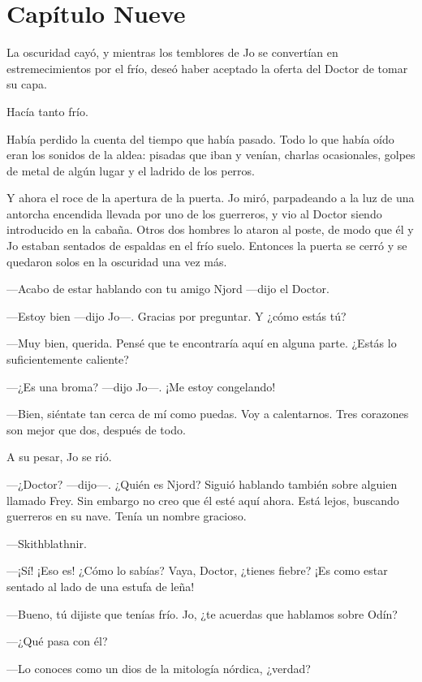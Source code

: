 \chapter*{Capítulo Nueve}

La oscuridad cayó, y mientras los temblores de Jo se convertían en
estremecimientos por el frío, deseó haber aceptado la oferta del Doctor
de tomar su capa.

Hacía tanto frío.

Había perdido la cuenta del tiempo que había pasado. Todo lo que había
oído eran los sonidos de la aldea: pisadas que iban y venían, charlas
ocasionales, golpes de metal de algún lugar y el ladrido de los perros.

Y ahora el roce de la apertura de la puerta. Jo miró, parpadeando a la
luz de una antorcha encendida llevada por uno de los guerreros, y vio al
Doctor siendo introducido en la cabaña. Otros dos hombres lo ataron al
poste, de modo que él y Jo estaban sentados de espaldas en el frío
suelo. Entonces la puerta se cerró y se quedaron solos en la oscuridad
una vez más.

---Acabo de estar hablando con tu amigo Njord ---dijo el Doctor.

---Estoy bien ---dijo Jo---. Gracias por preguntar. Y ¿cómo estás tú?

---Muy bien, querida. Pensé que te encontraría aquí en alguna parte.
¿Estás lo suficientemente caliente?

---¿Es una broma? ---dijo Jo---. ¡Me estoy congelando!

---Bien, siéntate tan cerca de mí como puedas. Voy a calentarnos. Tres
corazones son mejor que dos, después de todo.

A su pesar, Jo se rió.

---¿Doctor? ---dijo---. ¿Quién es Njord? Siguió hablando también sobre
alguien llamado Frey. Sin embargo no creo que él esté aquí ahora. Está
lejos, buscando guerreros en su nave. Tenía un nombre gracioso.

---Skithblathnir.

---¡Sí! ¡Eso es! ¿Cómo lo sabías? Vaya, Doctor, ¿tienes fiebre? ¡Es como
estar sentado al lado de una estufa de leña!

---Bueno, tú dijiste que tenías frío. Jo, ¿te acuerdas que hablamos
sobre Odín?

---¿Qué pasa con él?

---Lo conoces como un dios de la mitología nórdica, ¿verdad?

